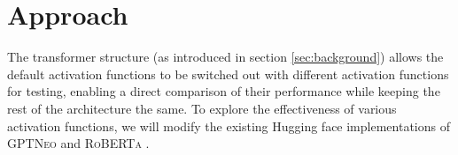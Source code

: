 



\section{Approach} %
\label{sec:approach}
The transformer structure (as introduced in section \ref{sec:background}) allows the default activation functions to be switched out with different activation functions for testing, enabling a direct comparison of their performance while keeping the rest of the architecture the same. To explore the effectiveness of various activation functions, we will modify the existing Hugging face implementations of \textsc{GPTNeo} \cite{huggingfaceNEO} and \textsc{RoBERTa} \cite{huggingfaceRoberta}.

